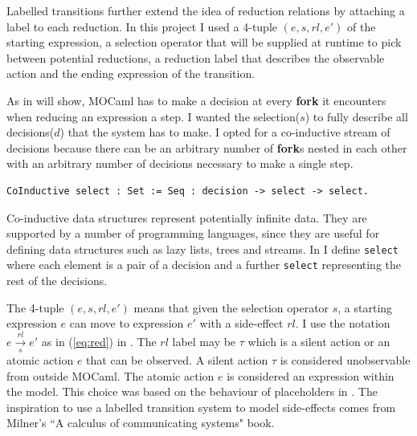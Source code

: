 \documentclass[12pt,twoside,notitlepage]{report}
\theoremstyle{plain}%
\theoremstyle{definition}
\theoremstyle{remark}
\begin{document}
Labelled transitions further extend the idea of reduction relations by attaching a label to each reduction. In this project I used a 4-tuple $ (e, s, rl, e') $ of the starting expression, a selection operator that will be supplied at runtime to pick between potential reductions, a reduction label that describes the observable action and the ending expression of the transition.

As  in  will show, MOCaml has to make a decision at every \textbf{fork} it encounters when reducing an expression a step. I wanted the selection($ s $) to fully describe all decisions($ d $) that the system has to make. I opted for a co-inductive stream of decisions because there can be an arbitrary number of \textbf{fork}s nested in each other with an arbitrary number of decisions necessary to make a single step. \vspace{5mm}

\begin{minipage}{\linewidth}

\begin{lstlisting}[language={Coq},caption={Coq co-inductive decision sequence}, label={lst:coqselectstar}]
CoInductive select : Set := Seq : decision -> select -> select.
\end{lstlisting}

\end{minipage}

Co-inductive data structures represent potentially infinite data.  They are supported by a number of programming languages, since they are useful for defining data structures such as lazy lists, trees and streams. In  I define \verb|select| where each element is a pair of a decision and a further \verb|select| representing the rest of the decisions. 

The 4-tuple $ (e, s, rl, e') $ means that given the selection operator $ s $, a starting expression $ e $  can move to expression $ e' $ with a side-effect $ rl $. I use the notation $ e \overset{rl}{\underset{s}{\longrightarrow}} e' $ as in (\ref{eq:red}) in . The $ rl $ label may be $ \tau $ which is a silent action or an atomic action $ e $ that can be observed. A silent action $\tau$ is considered unobservable from outside MOCaml. The atomic action $e$ is considered an expression within the model.  This choice was based on the behaviour of placeholders in . The inspiration to use a labelled transition system to model side-effects comes from Milner's ``A calculus of communicating systems" book\cite{milner1982calculus}.
\end{document}
